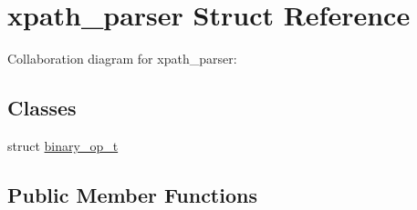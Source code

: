 \hypertarget{structxpath__parser}{}\section{xpath\+\_\+parser Struct Reference}
\label{structxpath__parser}


Collaboration diagram for xpath\+\_\+parser\+:
\subsection*{Classes}
\begin{DoxyCompactItemize}
\item 
struct \hyperlink{structxpath__parser_1_1binary__op__t}{binary\+\_\+op\+\_\+t}
\end{DoxyCompactItemize}
\subsection*{Public Member Functions}
